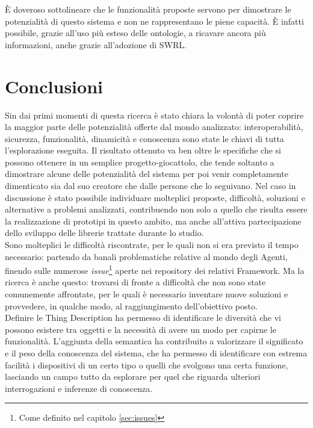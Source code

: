 \documentclass[12pt,a4paper,openright,oneside]{report}
\begin{document}
È doveroso sottolineare che le funzionalità proposte servono per dimostrare le potenzialità di questo sistema e non ne rappresentano le piene capacità. È infatti possibile, grazie all'uso più esteso delle ontologie, a ricavare ancora più informazioni, anche grazie all'adozione di SWRL.


\clearpage{\pagestyle{empty}\cleardoublepage}
\chapter{Conclusioni}           %
\lhead[\fancyplain{}{\bfseries\thepage}]{\fancyplain{}{\bfseries\rightmark}}  

Sin dai primi momenti di questa ricerca è stato chiara la volontà di poter coprire la maggior parte delle potenzialità offerte dal mondo analizzato: interoperabilità, sicurezza, funzionalità, dinamicità e conoscenza sono state le chiavi di tutta l'esplorazione eseguita. Il risultato ottenuto va ben oltre le specifiche che si possono ottenere in un semplice progetto-giocattolo, che tende soltanto a dimostrare alcune delle potenzialità del sistema per poi venir completamente dimenticato sia dal suo creatore che dalle persone che lo seguivano. Nel caso in discussione è stato possibile individuare molteplici proposte, difficoltà, soluzioni e alternative a problemi analizzati, contribuendo non solo a quello che risulta essere la realizzazione di prototipi in questo ambito, ma anche all'attiva partecipazione dello sviluppo delle librerie trattate durante lo studio.\\

Sono molteplici le difficoltà riscontrate, per le quali non si era previsto il tempo necessario: partendo da banali problematiche relative al mondo degli Agenti, finendo sulle numerose \textit{issue}\footnote{Come definito nel capitolo \ref{sec:issues}} aperte nei repository dei relativi Framework. Ma la ricerca è anche questo: trovarsi di fronte a difficoltà che non sono state comunemente affrontate, per le quali è necessario inventare nuove soluzioni e provvedere, in qualche modo, al raggiungimento dell'obiettivo posto.\\

Definire le Thing Description ha permesso di identificare le diversità che vi possono esistere tra oggetti e la necessità di avere un modo per capirne le funzionalità. L'aggiunta della semantica ha contribuito a valorizzare il significato e il peso della conoscenza del sistema, che ha permesso di identificare con estrema facilità i dispositivi di un certo tipo o quelli che svolgono una certa funzione, lasciando un campo tutto da esplorare per quel che riguarda ulteriori interrogazioni e inferenze di conoscenza.\\
\end{document}
